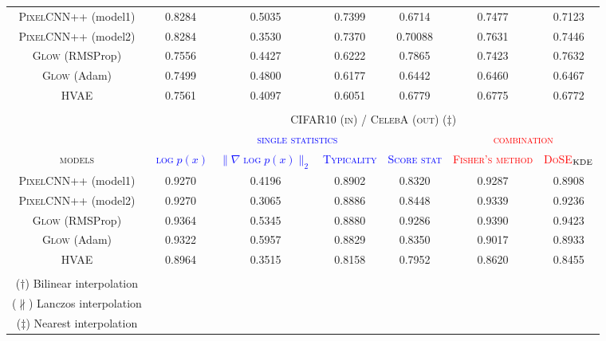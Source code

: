 {\begin{table}[tb]
{\begin{tabular}{ccccccc}
            \midrule
            \textsc{PixelCNN++} (model1)  &  0.8284  & 0.5035 & 0.7399 & 0.6714  & 0.7477 & 0.7123 \\
            \textsc{PixelCNN++} (model2) & 0.8284 & 0.3530 &   0.7370 & 0.70088 & 0.7631 & 0.7446\\
            \textsc{Glow} (RMSProp)  & 0.7556 & 0.4427 &  0.6222 & 0.7865  & 0.7423 & 0.7632 \\
            \textsc{Glow} (Adam)   & 0.7499 & 0.4800 &  0.6177 &  0.6442  &  0.6460 &  0.6467 \\
            \textsc{HVAE}  & 0.7561 &   0.4097 & 0.6051 &  0.6779 &  0.6775 &  0.6772  \\
            \bottomrule
             & & & & & & \\
            \toprule
            &\multicolumn{6}{c}{\textsc{CIFAR10 (in) / CelebA (out) ($\ddagger$)}}\\
            \cmidrule{2-7}
            & \multicolumn{4}{c}{\textcolor{blue}{\textsc{single statistics}}} & \multicolumn{2}{c}{\textcolor{red}{\textsc{combination}}}\\
            \cmidrule(r){2-5}\cmidrule(l){6-7}
            \textsc{models}  & \textcolor{blue}{\textsc{$\log p(x)$}} & \textcolor{blue}{\textsc{$\|\nabla \log p(x)\|_2$}} & \textcolor{blue}{\textsc{Typicality}} & \textcolor{blue}{\textsc{Score stat}} & \textcolor{red}{\textsc{Fisher's method}} & \textcolor{red}{\textsc{DoSE$_{\textup{KDE}}$}} \\
            \midrule
            \textsc{PixelCNN++} (model1)  & 0.9270  & 0.4196 & 0.8902 &  0.8320 & 0.9287 &  0.8908 \\
            \textsc{PixelCNN++} (model2) & 0.9270 & 0.3065 & 0.8886 & 0.8448 & 0.9339 & 0.9236 \\
            \textsc{Glow} (RMSProp)  & 0.9364 & 0.5345 &  0.8880 & 0.9286  & 0.9390 & 0.9423 \\
            \textsc{Glow} (Adam)   &  0.9322 & 0.5957 & 0.8829  &  0.8350  & 0.9017 &  0.8933 \\
            \textsc{HVAE}  & 0.8964 & 0.3515  & 0.8158 & 0.7952 &  0.8620 &   0.8455 \\
            \bottomrule
            \vspace{-0.2cm}\\
            ($\dagger$) Bilinear interpolation \\
            \hspace{0.06cm}($\nparallel$) Lanczos interpolation \\
            ($\ddagger$) Nearest interpolation\\
        \end{tabular}
        \label{table:celeba}
    }
    \vspace*{-\baselineskip}
\end{table}


}
